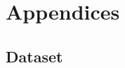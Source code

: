 \documentclass[11pt,]{article}
\begin{document}
\cleardoublepage
\appendix
\setcounter{table}{0}
\setcounter{figure}{0}
\renewcommand{\thetable}{A\arabic{table}}
\renewcommand{\thefigure}{A\arabic{figure}}

\hypertarget{appendices}{%
\section{Appendices}\label{appendices}}

\hypertarget{dataset}{%
\subsection{\texorpdfstring{Dataset
\label{chap:ap1}}{Dataset }}\label{dataset}}

\end{document}
